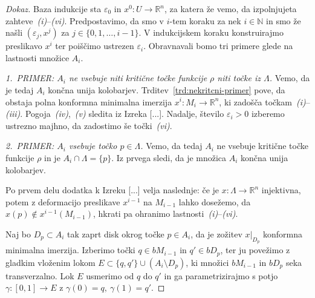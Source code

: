 \documentclass[12pt,a4paper,twoside]{article}
\theoremstyle{definition} %
\newenvironment{dokaz}[1][Dokaz]{\begin{proof}[#1]}{\end{proof}}
\theoremstyle{plain} %
\numberwithin{equation}{section}  %
\begin{document}
\begin{dokaz}
Baza indukcije sta $\varepsilon_0$ in $x^{0} \colon U \to \mathbb{R}^{n}$, za katera že vemo, da izpolnjujeta zahteve~\textit{(i)}--\textit{(vi)}. \newline
Predpostavimo, da smo v $i$-tem koraku za nek $i \in \mathbb{N}$ in smo že našli $(\varepsilon_{j}, x^{j})$ za $j \in \{ 0, 1, \dots , i-1 \}$. V indukcijskem koraku konstruirajmo preslikavo $x^{i}$ ter poiščimo ustrezen $\varepsilon_{i}$.
Obravnavali bomo tri primere glede na lastnosti množice $A_{i}$. \newline

\textit{1.~PRIMER: $A_{i}$ ne vsebuje niti kritične točke funkcije $\rho$ niti točke iz $\Lambda$.} \newline
Vemo, da je tedaj $A_{i}$ končna unija kolobarjev. Trditev~\ref{trd:nekritcni-primer} pove, da obstaja polna konformna minimalna imerzija $x^{i} \colon M_{i} \to \mathbb{R}^{n}$, ki zadošča točkam~\textit{(i)}--\textit{(iii)}.
Pogoja~\textit{(iv)},~\textit{(v)} sledita iz Izreka [...]. %
Nadalje, število $\varepsilon_{i} > 0$ izberemo ustrezno majhno, da zadostimo še točki~\textit{(vi)}. \newline

\textit{2.~PRIMER: $A_{i}$ vsebuje točko $p \in \Lambda$.} \newline
Vemo, da tedaj $A_{i}$ ne vsebuje kritične točke funkcije $\rho$ in je $A_{i} \cap \Lambda = \{p\}$. Iz prvega sledi, da je množica $A_{i}$ končna unija kolobarjev.

Po prvem delu dodatka k Izreku [...] %
velja naslednje: če je $x \colon \Lambda \to \mathbb{R}^{n}$ injektivna, potem z deformacijo preslikave $x^{i-1}$ na $M_{i-1}$ lahko dosežemo, da $x(p) \notin x^{i-1}(M_{i-1})$, hkrati pa ohranimo lastnosti~\textit{(i)}--\textit{(vi)}.

Naj bo $D_{p} \subset A_{i}$ tak zaprt disk okrog točke $p \in A_{i}$, da je zožitev $x|_{D_{p}}$ konformna minimalna imerzija.
Izberimo točki $q \in bM_{i-1}$ in $q' \in bD_{p}$, ter ju povežimo z gladkim vloženim lokom $E \subset \{q,q'\} \cup (A_{i} \setminus D_{p})$, ki množici $bM_{i-1}$ in $bD_{p}$ seka transverzalno. Lok $E$ usmerimo od $q$ do $q'$ in ga parametrizirajmo s potjo $\gamma \colon [0,1] \to E$ z $\gamma(0)=q, \ \gamma(1)=q'$.


\end{dokaz}
\end{document}
